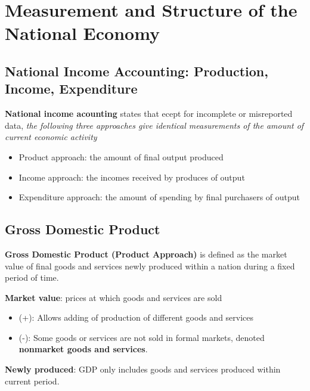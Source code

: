 \section{Measurement and Structure of the National Economy}

\subsection{National Income Accounting: Production, Income, Expenditure}

\textbf{National income acounting} states that ecept for incomplete or misreported data, \textit{the following three approaches give identical measurements of the amount of current economic activity}
\begin{itemize}
    \item Product approach: the amount of final output produced 
    \item Income approach: the incomes received by produces of output
    \item Expenditure approach: the amount of spending by final purchasers of output
\end{itemize} 

\subsection{Gross Domestic Product}

\begin{definition}
    \textbf{Gross Domestic Product (Product Approach)} is defined as the market value of final goods and services newly produced within a nation during a fixed period of time.
\end{definition}

\begin{remarks}
    \textbf{Market value}: prices at which goods and services are sold
    \begin{itemize}
        \item (+): Allows adding of production of different goods and services
        \item (-): Some goods or services are not sold in formal markets, denoted \textbf{nonmarket goods and services}.
    \end{itemize}
\end{remarks}

\begin{remarks}
    \textbf{Newly produced}: GDP only includes goods and services produced within current period.
\end{remarks}

